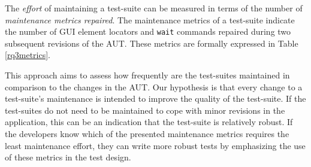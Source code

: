 \begin{table}
\centering
{}
  \captionsetup{justification=justified,
singlelinecheck=false}
\caption{Overview of the test-suite maintenance metrics. The first part shows the number of repaired \texttt{wait} conditions, the second part shows the number of repaired GUI element locators.}
\label{rq3metrics}
\end{table}


The \textit{effort} of maintaining a test-suite can be measured in terms of the number of \textit{maintenance metrics repaired}. The maintenance metrics of a test-suite indicate the number of GUI element locators and \texttt{wait} commands repaired during two subsequent revisions of the AUT. These metrics are formally expressed in Table \ref{rq3metrics}. 

This approach aims to assess how frequently are the test-suites maintained in comparison to the changes in the AUT. Our hypothesis is that every change to a test-suite's maintenance is intended to improve the quality of the test-suite. If the test-suites do not need to be maintained to cope with minor revisions in the application, this can be an indication that the test-suite is relatively robust. If the developers know which of the presented maintenance metrics requires the least maintenance effort, they can write more robust tests by emphasizing the use of these metrics in the test design. 

